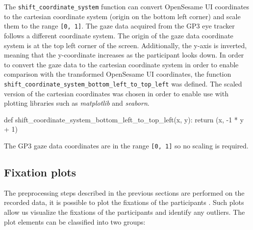 \documentclass[
  a4paper,
]{article}
\newenvironment{Shaded}{}{}
\newcommand{\ControlFlowTok}[1]{\textcolor[rgb]{0.84,0.23,0.29}{#1}}
\newcommand{\DecValTok}[1]{\textcolor[rgb]{0.00,0.36,0.77}{#1}}
\newcommand{\KeywordTok}[1]{\textcolor[rgb]{0.84,0.23,0.29}{#1}}
\newcommand{\NormalTok}[1]{\textcolor[rgb]{0.14,0.16,0.18}{#1}}
\newcommand{\OperatorTok}[1]{\textcolor[rgb]{0.14,0.16,0.18}{#1}}
\begin{document}
The \texttt{shift\_coordinate\_system} function can convert OpenSesame
UI coordinates to the cartesian coordinate system (origin on the bottom
left corner) and scale them to the range \texttt{{[}0,\ 1{]}}. The gaze
data acquired from the GP3 eye tracker follows a different coordinate
system. The origin of the gaze data coordinate system is at the top left
corner of the screen. Additionally, the y-axis is inverted, meaning that
the y-coordinate increases as the participant looks down. In order to
convert the gaze data to the cartesian coordinate system in order to
enable comparison with the transformed OpenSesame UI coordinates, the
function \texttt{shift\_coordinate\_system\_bottom\_left\_to\_top\_left}
was defined. The scaled version of the cartesian coordinates was chosen
in order to enable use with plotting libraries such as \emph{matplotlib}
and \emph{seaborn}.

\begin{Shaded}
\begin{Highlighting}[]
\KeywordTok{def}\NormalTok{ shift\_coordinate\_system\_bottom\_left\_to\_top\_left(x, y):}
    \ControlFlowTok{return}\NormalTok{ (x, }\OperatorTok{{-}}\DecValTok{1} \OperatorTok{*}\NormalTok{ y }\OperatorTok{+} \DecValTok{1}\NormalTok{)}
\end{Highlighting}
\end{Shaded}

\begin{tcolorbox}[enhanced jigsaw, toprule=.15mm, colbacktitle=quarto-callout-note-color!10!white, opacityback=0, rightrule=.15mm, colframe=quarto-callout-note-color-frame, coltitle=black, titlerule=0mm, breakable, colback=white, arc=.35mm, opacitybacktitle=0.6, bottomrule=.15mm, bottomtitle=1mm, leftrule=.75mm, toptitle=1mm, title=\textcolor{quarto-callout-note-color}{\faInfo}\hspace{0.5em}{Nota Bene}, left=2mm]

The GP3 gaze data coordinates are in the range \texttt{{[}0,\ 1{]}} so
no scaling is required.

\end{tcolorbox}

\hypertarget{fixation-plots}{%
\subsection{Fixation plots}\label{fixation-plots}}

The preprocessing steps described in the previous sections are performed
on the recorded data, it is possible to plot the fixations of the
participants . Such plots allow us visualize the fixations of the
participants and identify any outliers. The plot elements can be
classified into two groups:
\end{document}
